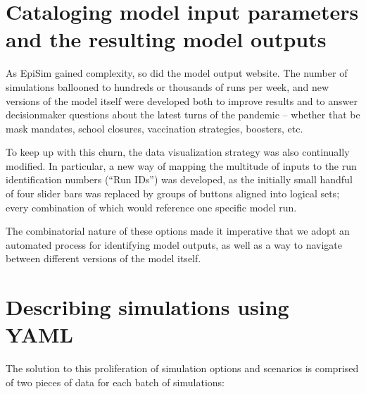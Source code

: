 \hypertarget{covid-cataloging-model-input-parameters-and-the-resulting-model-outputs}{%
\section{Cataloging model input parameters and the resulting model outputs}\label{cataloging-model-input-parameters-and-the-resulting-model-outputs}}

As EpiSim gained complexity, so did the model output website. The number of simulations ballooned to hundreds or thousands of runs per week, and new versions of the model itself were developed both to improve results and to answer decisionmaker questions about the latest turns of the pandemic -- whether that be mask mandates, school closures, vaccination strategies, boosters, etc.

To keep up with this churn, the data visualization strategy was also continually modified. In particular, a new way of mapping the multitude of inputs to the run identification numbers (``Run IDs'') was developed, as the initially small handful of four slider bars was replaced by groups of buttons aligned into logical sets; every combination of which would reference one specific model run.

The combinatorial nature of these options made it imperative that we adopt an automated process for identifying model outputs, as well as a way to navigate between different versions of the model itself.

\hypertarget{covid-describing-simulations-using-yaml}{%
\section{Describing simulations using YAML}\label{covid-describing-simulations-using-yaml}}

The solution to this proliferation of simulation options and scenarios is comprised of two pieces of data for each batch of simulations:

